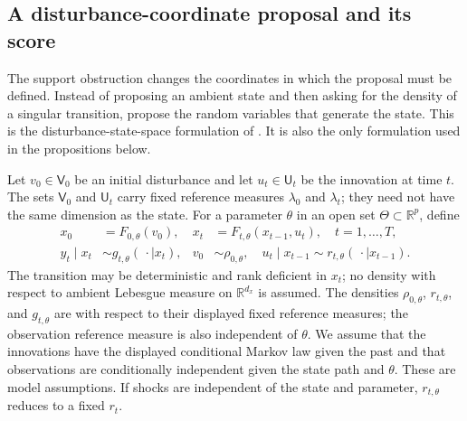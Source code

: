 \documentclass[11pt]{article}
\newcommand{\R}{\mathbb{R}}
\begin{document}
\subsection{A disturbance-coordinate proposal and its score}
\label{sec:disturbance-proposal}

The support obstruction changes the coordinates in which the proposal must be
defined. Instead of proposing an ambient state and then asking for the density
of a singular transition, propose the random variables that generate the
state. This is the disturbance-state-space formulation of
\citet[Sections 1--2]{murray2018disturbance}. It is also the only formulation
used in the propositions below.

Let $v_0\in\mathsf V_0$ be an initial disturbance and let
$u_t\in\mathsf U_t$ be the innovation at time $t$. The sets
$\mathsf V_0$ and $\mathsf U_t$ carry fixed reference measures
$\lambda_0$ and $\lambda_t$; they need not have the same dimension as the
state. For a parameter $\theta$ in an open set $\Theta\subset\R^p$, define
\begin{align}
 x_0&=F_{0,\theta}(v_0), &
 x_t&=F_{t,\theta}(x_{t-1},u_t), \quad t=1,\ldots,T, 
 \label{eq:disturbance-state-map}\\
 y_t\mid x_t&\sim g_{t,\theta}(\,\cdot\mid x_t), &
 v_0&\sim\rho_{0,\theta}, \quad
 u_t\mid x_{t-1}\sim r_{t,\theta}(\,\cdot\mid x_{t-1}).
 \label{eq:disturbance-model}
\end{align}
The transition may be deterministic and rank deficient in $x_t$; no density
with respect to ambient Lebesgue measure on $\R^{d_x}$ is assumed. The
densities $\rho_{0,\theta}$, $r_{t,\theta}$, and $g_{t,\theta}$ are with
respect to their displayed fixed reference measures; the observation
reference measure is also independent of $\theta$. We assume that the
innovations have the displayed conditional Markov law given the past and
that observations are conditionally independent given the state path and
$\theta$. These are model assumptions. If shocks are independent of the state
and parameter, $r_{t,\theta}$ reduces to a fixed $r_t$.
\end{document}
